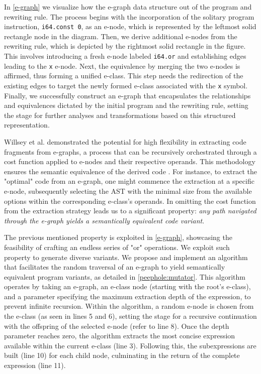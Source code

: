 In \autoref{e-graph} we visualize how the e-graph data structure out of the program and rewriting rule.
The process begins with the incorporation of the solitary program instruction, \texttt{i64.const 0}, as an e-node, which is represented by the leftmost solid rectangle node in the diagram.
Then, we derive additional e-nodes from the rewriting rule, which is depicted by the rightmost solid rectangle in the figure. 
This involves introducing a fresh e-node labeled \texttt{i64.or} and establishing edges leading to the \texttt{x} e-node.
Next, the equivalence by merging the two e-nodes is affirmed, thus forming a unified e-class. 
This step needs the redirection of the existing edges to target the newly formed e-class associated with the \texttt{x} symbol.
Finally, we successfully construct an e-graph that encapsulates the relationships and equivalences dictated by the initial program and the rewriting rule, setting the stage for further analyses and transformations based on this structured representation.

\label{traversal}

Willsey et al. demonstrated the potential for high flexibility in extracting code fragments from e-graphs, a process that can be recursively orchestrated through a cost function applied to e-nodes and their respective operands.
This methodology ensures the semantic equivalence of the derived code \cite{e-graph}. 
For instance, to extract the "optimal" code from an e-graph, one might commence the extraction at a specific e-node, subsequently selecting the AST with the minimal size from the available options within the corresponding e-class's operands.
In \too omitting the cost function from the extraction strategy leads us to a significant property: \emph{any path navigated through the e-graph yields a semantically equivalent code variant}. 

The previous mentioned property is exploited in \autoref{e-graph}, showcasing the feasibility of crafting an endless series of "or" operations. 
We exploit such property to generate diverse \Wasm variants.
We propose and implement an algorithm that facilitates the random traversal of an e-graph to yield semantically equivalent program variants, as detailed in \autoref{peephole:mutator}. 
This algorithm operates by taking an e-graph, an e-class node (starting with the root's e-class), and a parameter specifying the maximum extraction depth of the expression, to prevent infinite recursion.
Within the algorithm, a random e-node is chosen from the e-class (as seen in lines 5 and 6), setting the stage for a recursive continuation with the offspring of the selected e-node (refer to line 8). 
Once the depth parameter reaches zero, the algorithm extracts the most concise expression available within the current e-class (line 3). 
Following this, the subexpressions are built (line 10) for each child node, culminating in the return of the complete expression (line 11).


